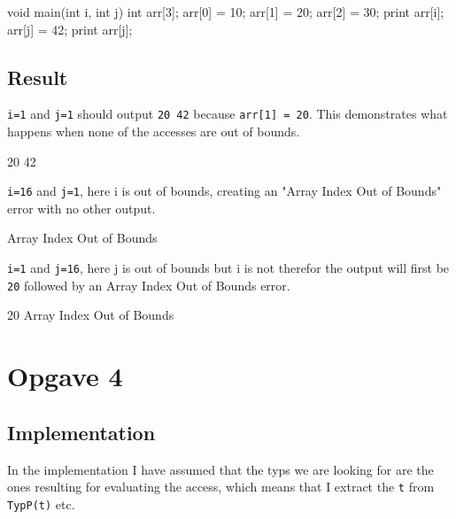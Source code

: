 \begin{ccode}
void main(int i, int j) {
    int arr[3];
    arr[0] = 10;
    arr[1] = 20;
    arr[2] = 30;
    print arr[i];
    arr[j] = 42;
    print arr[j];
}
\end{ccode}
\subsection{Result}
\texttt{i=1} and \texttt{j=1} should output \texttt{20 42} because
\texttt{arr[1] = 20}. This demonstrates what happens when none of the accesses
are out of bounds.
\begin{bashcode}
20 42 
\end{bashcode}
\texttt{i=16} and \texttt{j=1}, here i is out of bounds, creating an "Array
Index Out of Bounds" error with no other output.
\begin{bashcode}
Array Index Out of Bounds
\end{bashcode}
\texttt{i=1} and \texttt{j=16}, here j is out of bounds but i is not therefor the output will
first be \texttt{20} followed by an Array Index Out of Bounds error.
\begin{bashcode}
20 Array Index Out of Bounds
\end{bashcode}

\section{Opgave 4}
\subsection{Implementation}
In the implementation I have assumed that the typs we are looking for are the
ones resulting for evaluating the access, which means that I extract the
\texttt{t} from \texttt{TypP(t)} etc.

